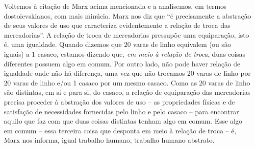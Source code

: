 Voltemos à citação de Marx acima mencionada e a analisemos, em termos
dostoievskianos, com mais minúcia. Marx nos diz que ``é precisamente a
abstração de seus valores de uso que caracteriza evidentemente a relação
de troca das mercadorias''. A relação de troca de mercadorias pressupõe
uma equiparação, isto é, uma igualdade. Quando dizemos que 20 varas de
linho equivalem (ou são iguais) a 1 casaco, estamos dizendo que\emph{,
em meio à relação de troca}, duas coisas diferentes possuem algo em
comum. Por outro lado, não pode haver relação de igualdade onde não há
diferença, uma vez que não trocamos 20 varas de linho por 20 varas de
linho e/ou 1 casaco por um mesmo casaco. Como as 20 varas de linho são
distintas, em si e para si, do casaco, a relação de equiparação das
mercadorias precisa proceder à abstração dos valores de uso -- as
propriedades físicas e de satisfação de necessidades fornecidas pelo
linho e pelo casaco -- para encontrar aquilo que faz com que duas coisas
distintas tenham algo em comum. Esse algo em comum -- essa terceira
coisa que desponta em meio à relação de troca -- é, Marx nos informa,
igual trabalho humano, trabalho humano abstrato.

